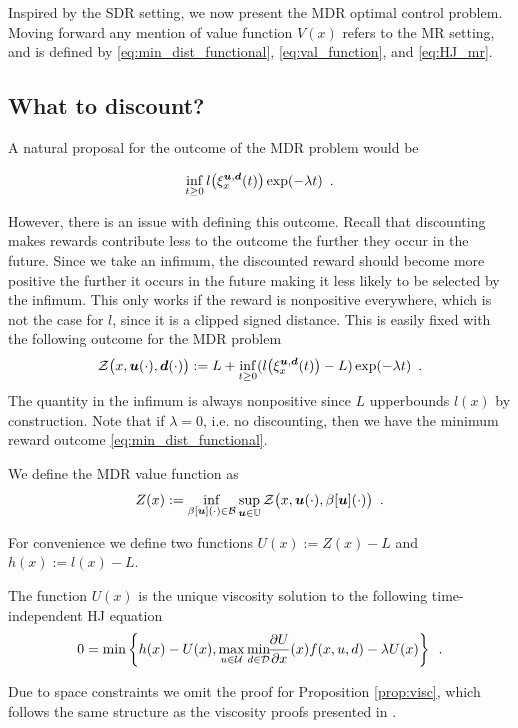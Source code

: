 Inspired by the SDR setting, we now present the MDR optimal control problem. Moving forward any mention of value function $V(x)$ refers to the MR setting, and is defined by \eqref{eq:min_dist_functional}, \eqref{eq:val_function}, and \eqref{eq:HJ_mr}.

\subsection{What to discount?}

A natural proposal for the outcome of the MDR problem would be
 
\begin{equation}
\inf_{t\ge 0}l\big(\xi_{x}^{\bm{u},\bm{d}}(t)\big)\exp(-\lambda  t) \enspace.
\end{equation}

However, there is an issue with defining this outcome. Recall that discounting makes rewards contribute less to the outcome the further they occur in the future. Since we take an infimum, the discounted reward should become more positive the further it occurs in the future making it less likely to be selected by the infimum. This only works if the reward is nonpositive everywhere, which is not the case for $l$, since it is a clipped signed distance. This is easily fixed with the following outcome for the MDR problem
%
\begin{equation}
\mathcal{Z}\big(x,\bm{u}(\cdot),\bm{d}(\cdot)\big) := L + \inf_{t\ge 0}(l\big(\xi_{x}^{\bm{u},\bm{d}}(t)\big)-L)\exp(-\lambda  t) \enspace.
\end{equation}%
\noindent The quantity in the infimum is always nonpositive since $L$ upperbounds $l(x)$ by construction. Note that if ${\lambda=0}$, i.e. no discounting, then we have the minimum reward outcome \eqref{eq:min_dist_functional}. 

We define the MDR value function as
%
\begin{equation} \label{eq:mdr_val_function}
Z(x):=\inf_{\beta[\bm{u}](\cdot) \in \mathcal{B}} \sup_{\bm{u} \in \mathbb{U}}\mathcal{Z}\big(x,\bm{u}(\cdot),\beta[\bm{u}](\cdot)\big) \enspace.
\end{equation}

For convenience we define two functions ${U(x):=Z(x)-L}$ and ${h(x):=l(x)-L}$. 
%
\begin{proposition}\label{prop:visc}
The function $U(x)$ is the unique viscosity solution to the following time-independent HJ equation
\begin{equation} \label{eq:HJ_mdr}
    0 = \min \left\{h(x)-U(x), \max_{u\in\mathcal{U}} \min_{ d\in\mathcal{D}} \!\!\frac{\partial U}{\partial x}(x) f(x,u, d) - \lambda U(x)\right\} \enspace.
\end{equation}
\end{proposition}%
\noindent Due to space constraints we omit the proof for Proposition \ref{prop:visc}, which follows the same structure as the viscosity proofs presented in \cite{Evans1984}. 

